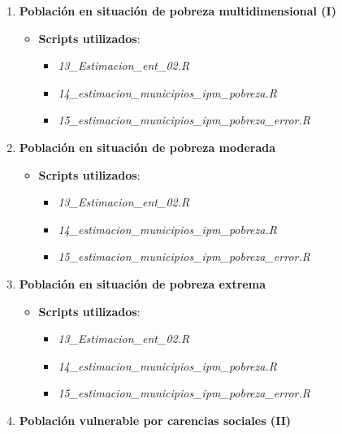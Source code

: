 \documentclass[
  12pt,
]{book}
\providecommand{\tightlist}{%
  \setlength{\itemsep}{0pt}\setlength{\parskip}{0pt}}
\begin{document}
\begin{enumerate}
\def\labelenumi{\arabic{enumi}.}
\tightlist
\item
  \textbf{Población en situación de pobreza multidimensional (I)}

  \begin{itemize}
  \tightlist
  \item
    \textbf{Scripts utilizados}:

    \begin{itemize}
    \tightlist
    \item
      \emph{13\_Estimacion\_ent\_02.R}
    \item
      \emph{14\_estimacion\_municipios\_ipm\_pobreza.R}
    \item
      \emph{15\_estimacion\_municipios\_ipm\_pobreza\_error.R}
    \end{itemize}
  \end{itemize}
\item
  \textbf{Población en situación de pobreza moderada}

  \begin{itemize}
  \tightlist
  \item
    \textbf{Scripts utilizados}:

    \begin{itemize}
    \tightlist
    \item
      \emph{13\_Estimacion\_ent\_02.R}
    \item
      \emph{14\_estimacion\_municipios\_ipm\_pobreza.R}
    \item
      \emph{15\_estimacion\_municipios\_ipm\_pobreza\_error.R}
    \end{itemize}
  \end{itemize}
\item
  \textbf{Población en situación de pobreza extrema}

  \begin{itemize}
  \tightlist
  \item
    \textbf{Scripts utilizados}:

    \begin{itemize}
    \tightlist
    \item
      \emph{13\_Estimacion\_ent\_02.R}
    \item
      \emph{14\_estimacion\_municipios\_ipm\_pobreza.R}
    \item
      \emph{15\_estimacion\_municipios\_ipm\_pobreza\_error.R}
    \end{itemize}
  \end{itemize}
\item
  \textbf{Población vulnerable por carencias sociales (II)}


\end{enumerate}
\end{document}
